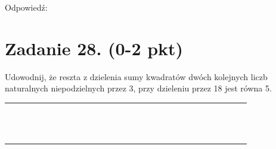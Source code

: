 \documentclass[10pt]{article}
\begin{document}
Odpowiedź:

\section*{Zadanie 28. (0-2 pkt)}
Udowodnij, że reszta z dzielenia sumy kwadratów dwóch kolejnych liczb naturalnych niepodzielnych przez 3, przy dzieleniu przez 18 jest równa 5.

\begin{center}
\begin{tabular}{|c|c|c|c|c|c|c|c|c|c|c|c|c|c|c|c|c|c|c|c|c|c|c|c|c|c|c|c|c|}
\hline
 &  &  &  &  &  &  &  &  &  &  &  &  &  &  &  &  &  &  &  &  &  &  &  &  &  &  &  &  \\
\hline
 &  &  &  &  &  &  &  &  &  &  &  &  &  &  &  &  &  &  &  &  &  &  &  &  &  &  &  &  \\
\hline
 &  &  &  &  &  &  &  &  &  &  &  &  &  &  &  &  &  &  &  &  &  &  &  &  &  &  &  &  \\
\hline
 &  &  &  &  &  &  &  &  &  &  &  &  &  &  &  &  &  &  &  &  &  &  &  &  &  &  &  &  \\
\hline
 &  &  &  &  &  &  &  &  &  &  &  &  &  &  &  &  &  &  &  &  &  &  &  &  &  &  &  &  \\
\hline
 &  &  &  &  &  &  &  &  &  &  &  &  &  &  &  &  &  &  &  &  &  &  &  &  &  &  &  &  \\
\hline
 &  &  &  &  &  &  &  &  &  &  &  &  &  &  &  &  &  &  &  &  &  &  &  &  &  &  &  &  \\
\hline
 &  &  &  &  &  &  &  &  &  &  &  &  &  &  &  &  &  &  &  &  &  &  &  &  &  &  &  &  \\
\hline
 &  &  &  &  &  &  &  &  &  &  &  &  &  &  &  &  &  &  &  &  &  &  &  &  &  &  &  &  \\
\hline
 &  &  &  &  &  &  &  &  &  &  &  &  &  &  &  &  &  &  &  &  &  &  &  &  &  &  &  &  \\
\hline
 &  &  &  &  &  &  &  &  &  &  &  &  &  &  &  &  &  &  &  &  &  &  &  &  &  &  &  &  \\
\hline
 &  &  &  &  &  &  &  &  &  &  &  &  &  &  &  &  &  &  &  &  &  &  &  &  &  &  &  &  \\
\hline
 &  &  &  &  &  &  &  &  &  &  &  &  &  &  &  &  &  &  &  &  &  &  &  &  &  &  &  &  \\
\hline
 &  &  &  &  &  &  &  &  &  &  &  &  &  &  &  &  &  &  &  &  &  &  &  &  &  &  &  &  \\
\hline

\end{tabular}
\end{center}
\end{document}
